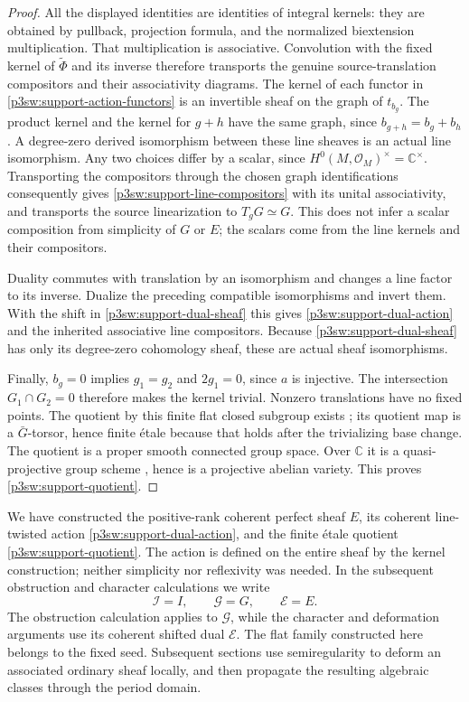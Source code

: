 \documentclass[11pt]{article}
\newcommand{\C}{\mathbb C}
\numberwithin{equation}{section}
\begin{document}
\begin{proof}
All the displayed identities are identities of integral kernels:
they are obtained by pullback, projection formula, and the
normalized biextension multiplication.  That multiplication is
associative.  Convolution with the fixed kernel of
\(\widetilde\Phi\) and its inverse therefore transports the genuine
source-translation compositors and their associativity diagrams.
The kernel of each functor in \eqref{p3sw:support-action-functors} is an invertible sheaf on the
graph of \(t_{b_g}\).  The product kernel and the kernel for \(g+h\)
have the same graph, since \(b_{g+h}=b_g+b_h\).  A degree-zero
derived isomorphism between these line sheaves is an actual line
isomorphism.  Any two choices differ by a scalar, since
\(H^0(M,\mathcal O_M)^\times=\C^\times\).  Transporting the
compositors through the chosen graph identifications consequently
gives \eqref{p3sw:support-line-compositors} with its unital associativity, and transports the source
linearization to \(T_gG\simeq G\).  This does not infer a scalar
composition from simplicity of \(G\) or \(E\); the scalars come
from the line kernels and their compositors.

Duality commutes with translation by an isomorphism and changes a
line factor to its inverse.  Dualize the preceding compatible
isomorphisms and invert them.  With the shift in \eqref{p3sw:support-dual-sheaf} this gives
\eqref{p3sw:support-dual-action} and the inherited associative line compositors.  Because \eqref{p3sw:support-dual-sheaf}
has only its degree-zero cohomology sheaf, these are actual sheaf
isomorphisms.

Finally, \(b_g=0\) implies \(g_1=g_2\) and \(2g_1=0\), since \(a\)
is injective.  The intersection \(G_1\cap G_2=0\) therefore makes
the kernel trivial.  Nonzero translations have no fixed points.
The quotient by this finite flat closed subgroup exists
\cite[Section 2, p.~136]{P3SWDeligneGabber}; its quotient map is a
\(\bar G\)-torsor, hence finite \'etale because that holds after the
trivializing base change.  The quotient is a proper smooth connected
group space.  Over \(\C\) it is a quasi-projective group scheme
\cite[Section 1.1(a), p.~131]{P3SWDeligneGabber}, hence is a projective
abelian variety.  This proves \eqref{p3sw:support-quotient}.
\end{proof}

We have constructed the positive-rank coherent perfect sheaf \(E\),
its coherent line-twisted action \eqref{p3sw:support-dual-action}, and
the finite \'etale quotient \eqref{p3sw:support-quotient}.  The action
is defined on the entire sheaf by the kernel construction; neither
simplicity nor reflexivity was needed.  In the subsequent obstruction
and character calculations we write
\[
 \mathcal I=I,\qquad \mathcal G=G,\qquad \mathcal E=E.
\]
The obstruction calculation applies to \(\mathcal G\), while the
character and deformation arguments use its coherent shifted dual
\(\mathcal E\).  The flat family constructed here belongs to the fixed
seed.  Subsequent sections use semiregularity to deform an associated
ordinary sheaf locally, and then propagate the resulting algebraic
classes through the period domain.
\end{document}
